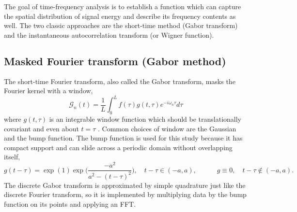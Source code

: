 \documentclass{article}
\begin{document}
The goal of time-frequency analysis is to establish a function which can capture the spatial distribution of signal energy and describe its frequency contents as well. The two classic approaches are the short-time method (Gabor transform) and the instantaneous autocorrelation transform (or Wigner function).
\subsection{Masked Fourier transform (Gabor method)}
The short-time Fourier transform, also called the Gabor transform, masks the Fourier kernel with a window,
\begin{equation}
  \mathcal{G}_n(t) = \frac{1}{L}\int_{0}^L f(\tau)g(t,\tau)e^{-i\omega_n\tau}d\tau
\end{equation}
where $g(t,\tau)$ is an integrable window function which should be translationally covariant and even about $t=\tau$ \cite{kutz}. Common choices of window are the Gaussian and the bump function. The bump function is used for this study because it has compact support and can slide across a periodic domain without overlapping itself,
\begin{equation}
  g(t-\tau) = \exp(1)\exp\Big(\frac{-a^2}{a^2-(t-\tau)^2}\Big),\quad t-\tau\in (-a,a),\quad\quad\quad g\equiv 0,\quad t-\tau\notin (-a,a).
\end{equation}
The discrete Gabor transform is approximated by simple quadrature just like the discrete Fourier transform, so it is implemented by multiplying data by the bump function on its points and applying an FFT.
\end{document}
